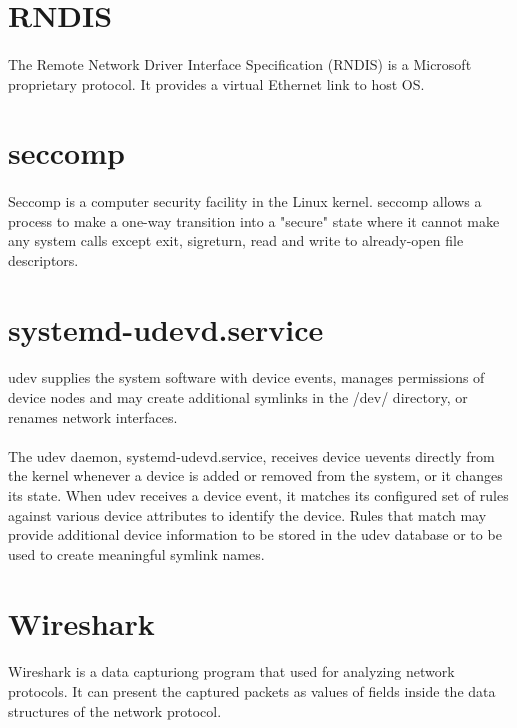 \documentclass[mscthesis]{usiinfthesis}
\begin{document}
\section{RNDIS}\label{sec:RNDIS}
\paragraph{}
The Remote Network Driver Interface Specification (RNDIS) is a Microsoft proprietary protocol. It provides a virtual Ethernet link to host OS.

\section{seccomp}\label{sec:seccomp}
\paragraph{}
Seccomp is a computer security facility in the Linux kernel. seccomp allows a process to make a one-way transition into a "secure" state where it cannot make any system calls except exit, sigreturn, read and write to already-open file descriptors.

\section{systemd-udevd.service}\label{sec:systemd-udevd.service}
\paragraph{}
udev supplies the system software with device events, manages permissions of device nodes and may create additional symlinks in the /dev/ directory, or renames network interfaces.
\paragraph{}
The udev daemon, systemd-udevd.service, receives device uevents directly from the kernel whenever a device is added or removed from the system, or it changes its state. When udev receives a device event, it matches its configured set of rules against various device attributes to identify the device. Rules that match may provide additional device information to be stored in the udev database or to be used to create meaningful symlink names.

\section{Wireshark}\label{sec:Wireshark}
\paragraph{}
Wireshark is a data capturiong program that used for analyzing network protocols. It can present the captured packets as values of fields inside the data structures of the network protocol.

%
%



\end{document}
